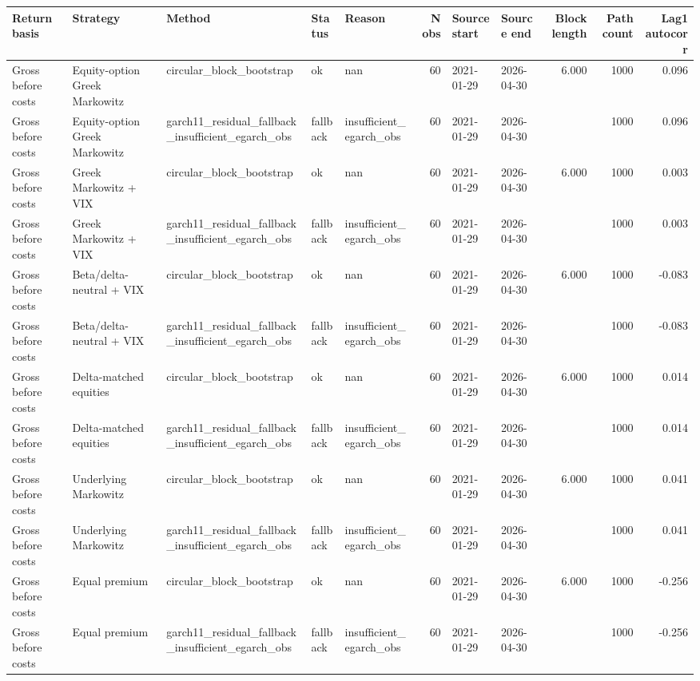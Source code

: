 \begin{tabular}{lllllrllrrr}
\toprule
Return basis & Strategy & Method & Status & Reason & N obs & Source start & Source end & Block length & Path count & Lag1 autocorr \\
\midrule
Gross before costs & Equity-option Greek Markowitz & circular\_block\_bootstrap & ok & nan & 60 & 2021-01-29 & 2026-04-30 & 6.000 & 1000 & 0.096 \\
Gross before costs & Equity-option Greek Markowitz & garch11\_residual\_fallback\_insufficient\_egarch\_obs & fallback & insufficient\_egarch\_obs & 60 & 2021-01-29 & 2026-04-30 &  & 1000 & 0.096 \\
Gross before costs & Greek Markowitz + VIX & circular\_block\_bootstrap & ok & nan & 60 & 2021-01-29 & 2026-04-30 & 6.000 & 1000 & 0.003 \\
Gross before costs & Greek Markowitz + VIX & garch11\_residual\_fallback\_insufficient\_egarch\_obs & fallback & insufficient\_egarch\_obs & 60 & 2021-01-29 & 2026-04-30 &  & 1000 & 0.003 \\
Gross before costs & Beta/delta-neutral + VIX & circular\_block\_bootstrap & ok & nan & 60 & 2021-01-29 & 2026-04-30 & 6.000 & 1000 & -0.083 \\
Gross before costs & Beta/delta-neutral + VIX & garch11\_residual\_fallback\_insufficient\_egarch\_obs & fallback & insufficient\_egarch\_obs & 60 & 2021-01-29 & 2026-04-30 &  & 1000 & -0.083 \\
Gross before costs & Delta-matched equities & circular\_block\_bootstrap & ok & nan & 60 & 2021-01-29 & 2026-04-30 & 6.000 & 1000 & 0.014 \\
Gross before costs & Delta-matched equities & garch11\_residual\_fallback\_insufficient\_egarch\_obs & fallback & insufficient\_egarch\_obs & 60 & 2021-01-29 & 2026-04-30 &  & 1000 & 0.014 \\
Gross before costs & Underlying Markowitz & circular\_block\_bootstrap & ok & nan & 60 & 2021-01-29 & 2026-04-30 & 6.000 & 1000 & 0.041 \\
Gross before costs & Underlying Markowitz & garch11\_residual\_fallback\_insufficient\_egarch\_obs & fallback & insufficient\_egarch\_obs & 60 & 2021-01-29 & 2026-04-30 &  & 1000 & 0.041 \\
Gross before costs & Equal premium & circular\_block\_bootstrap & ok & nan & 60 & 2021-01-29 & 2026-04-30 & 6.000 & 1000 & -0.256 \\
Gross before costs & Equal premium & garch11\_residual\_fallback\_insufficient\_egarch\_obs & fallback & insufficient\_egarch\_obs & 60 & 2021-01-29 & 2026-04-30 &  & 1000 & -0.256 \\

\end{tabular}
